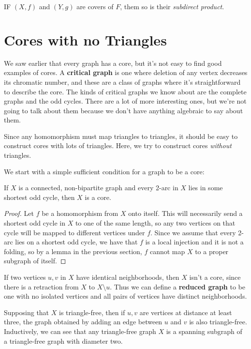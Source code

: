 IF $(X,f)$ and $(Y,g)$ are covers of $F$, them so is their \textit{subdirect product}.




\section*{Cores with no Triangles}

We saw earlier that every graph has a core, but it's not easy to find good examples of cores.  A \textbf{critical graph} is one where deletion of any vertex decreases its chromatic number, and these are a class of graphs where it's straightforward to describe the core. The kinds of critical graphs we know about are the complete graphs and the odd cycles.  There are a lot of more interesting ones, but we're not going to talk about them because we don't have anything algebraic to say about them.

Since any homomorphism must map triangles to triangles, it should be easy to construct cores with lots of triangles.  Here, we try to construct cores \textit{without} triangles.

We start with a simple sufficient condition for a graph to be a core:

\begin{lemma}
	If $X$ is a connected, non-bipartite graph and every 2-arc in $X$ lies in some shortest odd cycle, then $X$ is a core.
\end{lemma}
\begin{proof}
	Let $f$ be a homomorphism from $X$ onto itself.  This will necessarily send a shortest odd cycle in $X$ to  one of the same length, so any two vertices on that cycle will be mapped to different vertices under $f$.  Since we assume that every 2-arc lies on a shortest odd cycle, we have that $f$ is a local injection and it is not a folding, so by a lemma in the previous section, $f$ cannot map $X$ to a proper subgraph of itself.
\end{proof}

If two vertices $u,v$ in $X$ have identical neighborhoods, then $X$ isn't a core, since there is a retraction from $X$ to $X{\setminus}u$.  Thus we can define a \textbf{reduced graph} to be one with no isolated vertices and all pairs of vertices have distinct neighborhoods.

Supposing that $X$ is triangle-free, then if $u,v$ are vertices at distance at least three, the graph obtained by adding an edge between $u$ and $v$ is also triangle-free.  Inductively, we can see that any triangle-free graph $X$ is a spanning subgraph of a triangle-free graph with diameter two.

